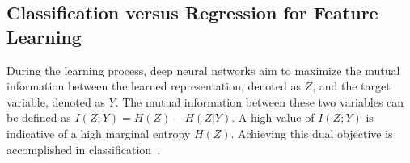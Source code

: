 \documentclass{article}
\theoremstyle{plain}
\theoremstyle{definition}
\theoremstyle{remark}
\begin{document}

\subsection{Classification versus Regression for Feature Learning}
\label{subsec:classification_vs_regression}

During the learning process, deep neural networks aim to maximize the mutual information between the learned representation, denoted as \(Z\), and the target variable, denoted as \(Y\). 
The mutual information between these two variables can be defined as \(I(Z; Y) = H(Z) - H(Z | Y)\). A high value of \(I(Z; Y)\) is indicative of a high marginal entropy \(H(Z)\). 
Achieving this dual objective is accomplished in classification~\citep{boudiaf2020}.
\end{document}
